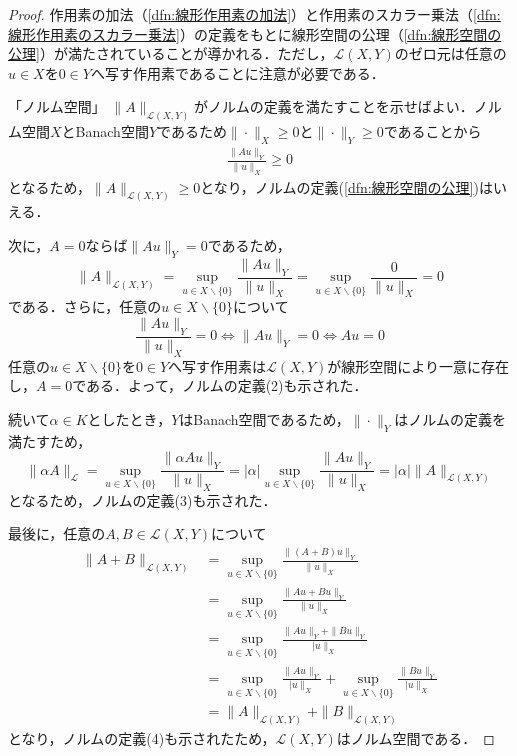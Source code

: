 \documentclass[11pt,a4paper]{jsarticle}
\theoremstyle{definition}
\begin{document}
\begin{proof}
  作用素の加法（\ref{dfn:線形作用素の加法}）と作用素のスカラー乗法（\ref{dfn:線形作用素のスカラー乗法}）の定義をもとに線形空間の公理（\ref{dfn:線形空間の公理}）が満たされていることが導かれる．ただし，$\mathcal{L}(X,Y)$のゼロ元は任意の$u\in X$を$0\in Y$へ写す作用素であることに注意が必要である．

  「ノルム空間」
  $\|A\|_{\mathcal{L}(X,Y)}$がノルムの定義を満たすことを示せばよい．ノルム空間$X$とBanach空間$Y$であるため$\|\cdot\|_X\geq 0$と$\|\cdot\|_Y\geq 0$であることから
  \begin{align*}
    \frac{\|Au\|_Y}{\|u\|_X} \geq 0
  \end{align*}
  となるため，$\|A\|_{\mathcal{L}(X,Y)}\geq 0$となり，ノルムの定義(\ref{dfn:線形空間の公理})はいえる．

  次に，$A=0$ならば$\|Au\|_Y=0$であるため，
  \begin{equation*}
    \|A\|_{\mathcal{L}(X,Y)}=\sup_{u\in X\backslash \{0\}} \frac{\|Au\|_Y}{\|u\|_X} = \sup_{u\in X\backslash \{0\}} \frac{0}{\|u\|_X} = 0
  \end{equation*}
  である．さらに，任意の$u\in X\backslash\{0\}$について
  \begin{equation*}
    \frac{\|Au\|_Y}{\|u\|_X} = 0 \Leftrightarrow \|Au\|_Y=0 \Leftrightarrow Au=0
  \end{equation*}
  任意の$u\in X\backslash \{0\}$を$0\in Y$へ写す作用素は$\mathcal{L}(X,Y)$が線形空間により一意に存在し，$A=0$である．よって，ノルムの定義(2)も示された．

  続いて$\alpha\in K$としたとき，$Y$はBanach空間であるため，$\|\cdot\|_Y$はノルムの定義を満たすため，
  \begin{equation*}
    \|\alpha A\|_{\mathcal{L}} = \sup_{u\in X\backslash \{0\}} \frac{\|\alpha Au\|_Y}{\|u\|_X} = |\alpha|\sup_{u\in X\backslash \{0\}} \frac{\| Au\|_Y}{\|u\|_X} = |\alpha|\|A\|_{\mathcal{L}(X,Y)}
  \end{equation*}
  となるため，ノルムの定義(3)も示された．

  最後に，任意の$A,B\in \mathcal{L}(X,Y)$について
  \begin{align*}
    \|A+B\|_{\mathcal{L}(X,Y)} & = \sup_{u\in X\backslash \{0\}} \frac{\|(A+B)u\|_Y}{\|u\|_X}                                                    \\
                               & = \sup_{u\in X\backslash \{0\}} \frac{\|Au+Bu\|_Y}{\|u\|_X}                                                     \\
                               & = \sup_{u\in X\backslash \{0\}} \frac{\|Au\|_Y + \|Bu\|_Y}{|u\|_X}                                              \\
                               & = \sup_{u\in X\backslash \{0\}} \frac{\|Au\|_Y}{|u\|_X} + \sup_{u\in X\backslash \{0\}} \frac{\|Bu\|_Y}{|u\|_X} \\
                               & = \|A\|_{\mathcal{L}(X,Y)} + \|B\|_{\mathcal{L}(X,Y)}
  \end{align*}
  となり，ノルムの定義(4)も示されたため，$\mathcal{L}(X,Y)$はノルム空間である．


\end{proof}
\end{document}
